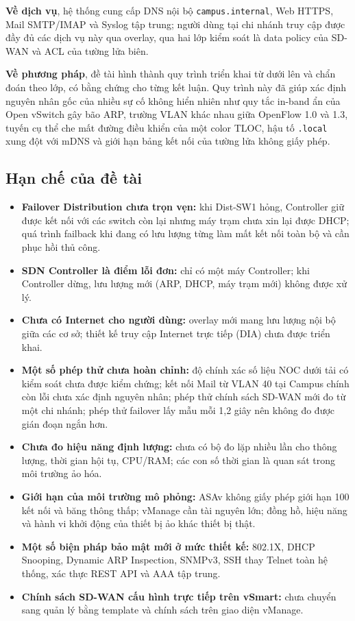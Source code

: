 \textbf{Về dịch vụ}, hệ thống cung cấp DNS nội bộ \texttt{campus.internal}, Web HTTPS, Mail SMTP/IMAP và Syslog tập trung; người dùng tại chi nhánh truy cập được đầy đủ các dịch vụ này qua overlay, qua hai lớp kiểm soát là data policy của SD-WAN và ACL của tường lửa biên.

\textbf{Về phương pháp}, đề tài hình thành quy trình triển khai từ dưới lên và chẩn đoán theo lớp, có bằng chứng cho từng kết luận. Quy trình này đã giúp xác định nguyên nhân gốc của nhiều sự cố không hiển nhiên như quy tắc in-band ẩn của Open vSwitch gây bão ARP, trường VLAN khác nhau giữa OpenFlow 1.0 và 1.3, tuyến cụ thể che mất đường điều khiển của một color TLOC, hậu tố \texttt{.local} xung đột với mDNS và giới hạn bảng kết nối của tường lửa không giấy phép.

\subsection{Hạn chế của đề tài}

\begin{itemize}
    \item \textbf{Failover Distribution chưa trọn vẹn:} khi Dist-SW1 hỏng, Controller giữ được kết nối với các switch còn lại nhưng máy trạm chưa xin lại được DHCP; quá trình failback khi đang có lưu lượng từng làm mất kết nối toàn bộ và cần phục hồi thủ công.
    \item \textbf{SDN Controller là điểm lỗi đơn:} chỉ có một máy Controller; khi Controller dừng, lưu lượng mới (ARP, DHCP, máy trạm mới) không được xử lý.
    \item \textbf{Chưa có Internet cho người dùng:} overlay mới mang lưu lượng nội bộ giữa các cơ sở; thiết kế truy cập Internet trực tiếp (DIA) chưa được triển khai.
    \item \textbf{Một số phép thử chưa hoàn chỉnh:} độ chính xác số liệu NOC dưới tải có kiểm soát chưa được kiểm chứng; kết nối Mail từ VLAN 40 tại Campus chính còn lỗi chưa xác định nguyên nhân; phép thử chính sách SD-WAN mới đo từ một chi nhánh; phép thử failover lấy mẫu mỗi 1,2 giây nên không đo được gián đoạn ngắn hơn.
    \item \textbf{Chưa đo hiệu năng định lượng:} chưa có bộ đo lặp nhiều lần cho thông lượng, thời gian hội tụ, CPU/RAM; các con số thời gian là quan sát trong môi trường ảo hóa.
    \item \textbf{Giới hạn của môi trường mô phỏng:} ASAv không giấy phép giới hạn 100 kết nối và băng thông thấp; vManage cần tài nguyên lớn; đồng hồ, hiệu năng và hành vi khởi động của thiết bị ảo khác thiết bị thật.
    \item \textbf{Một số biện pháp bảo mật mới ở mức thiết kế:} 802.1X, DHCP Snooping, Dynamic ARP Inspection, SNMPv3, SSH thay Telnet toàn hệ thống, xác thực REST API và AAA tập trung.
    \item \textbf{Chính sách SD-WAN cấu hình trực tiếp trên vSmart:} chưa chuyển sang quản lý bằng template và chính sách trên giao diện vManage.
\end{itemize}

